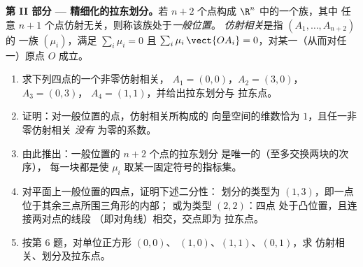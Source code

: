 \begin{problem}
\medskip
\noindent\textbf{第 II 部分 --- 精细化的拉东划分。}若
$n + 2$ 个点构成 $\R^n$ 中的一个族，其中
任意 $n + 1$ 个点仿射无关，则称该族处于\emph{一般位置}。
\emph{仿射相关}是指 $(A_1, \dots, A_{n+2})$ 的
一族 $(\mu_i)$，满足 $\sum_i \mu_i = 0$ 且 $\sum_i
\mu_i\,\vect{OA_i} = 0$，对某一（从而对任一）原点 $O$ 成立。
\begin{enumerate}[resume]
  \item 求下列四点的一个非零仿射相关，
        $A_1 = (0,0)$，$A_2 = (3,0)$，$A_3 = (0,3)$，
        $A_4 = (1,1)$，并给出拉东划分与
        拉东点。
  \item 证明：对一般位置的点，仿射相关所构成的
        向量空间的维数恰为
        $1$，且任一非零仿射相关 \emph{没有}
        为零的系数。
  \item 由此推出：一般位置的 $n + 2$ 个点的拉东划分
        是唯一的（至多交换两块的次序），
        每一块都是使
        $\mu_i$ 取某一固定符号的指标集。
  \item 对平面上一般位置的四点，证明下述二分性：
        划分的类型为
        $(1, 3)$，即一点位于其余三点所围三角形的内部；
        或为类型 $(2, 2)$：四点
        处于凸位置，且连接两对点的线段
        （即对角线）相交，交点即为
        拉东点。
  \item 按第 6 题，对单位正方形 $(0,0)$、
        $(1,0)$、$(1,1)$、$(0,1)$，求
        仿射相关、划分及拉东点。
\end{enumerate}


\end{problem}
